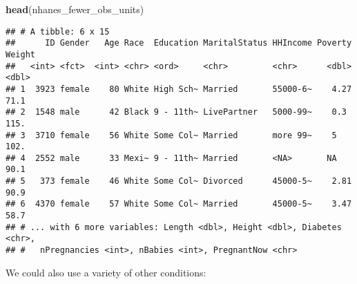 \documentclass[]{article}
\newenvironment{Shaded}{\begin{snugshade}}{\end{snugshade}}
\newcommand{\KeywordTok}[1]{\textcolor[rgb]{0.13,0.29,0.53}{\textbf{#1}}}
\newcommand{\DecValTok}[1]{\textcolor[rgb]{0.00,0.00,0.81}{#1}}
\newcommand{\StringTok}[1]{\textcolor[rgb]{0.31,0.60,0.02}{#1}}
\newcommand{\OperatorTok}[1]{\textcolor[rgb]{0.81,0.36,0.00}{\textbf{#1}}}
\newcommand{\NormalTok}[1]{#1}
\begin{document}
\begin{Shaded}
\begin{Highlighting}[]
\KeywordTok{head}\NormalTok{(nhanes_fewer_obs_units)}
\end{Highlighting}
\end{Shaded}

\begin{verbatim}
## # A tibble: 6 x 15
##      ID Gender   Age Race  Education MaritalStatus HHIncome Poverty Weight
##   <int> <fct>  <int> <chr> <ord>     <chr>         <chr>      <dbl>  <dbl>
## 1  3923 female    80 White High Sch~ Married       55000-6~    4.27   71.1
## 2  1548 male      42 Black 9 - 11th~ LivePartner   5000-99~    0.3   115. 
## 3  3710 female    56 White Some Col~ Married       more 99~    5     102. 
## 4  2552 male      33 Mexi~ 9 - 11th~ Married       <NA>       NA      90.1
## 5   373 female    46 White Some Col~ Divorced      45000-5~    2.81   90.9
## 6  4370 female    57 White Some Col~ Married       45000-5~    3.47   58.7
## # ... with 6 more variables: Length <dbl>, Height <dbl>, Diabetes <chr>,
## #   nPregnancies <int>, nBabies <int>, PregnantNow <chr>
\end{verbatim}

We could also use a variety of other conditions:

\begin{Shaded}
\end{Shaded}

\begin{Shaded}
\end{Shaded}

\begin{Shaded}
\end{Shaded}
\end{document}
